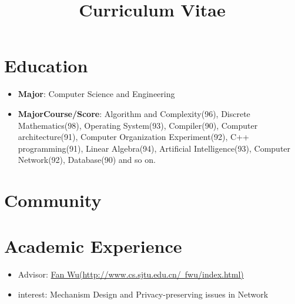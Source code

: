 \documentclass[11pt,a4paper]{moderncv}
\title{Curriculum Vitae}
\begin{document}
\maketitle

\section{Education}
{
\begin{itemize}
\item \textbf{Major}: Computer Science and Engineering
\item \textbf{MajorCourse/Score}: Algorithm and Complexity(96), Discrete Mathematics(98), Operating System(93), Compiler(90), Computer architecture(91), Computer Organization Experiment(92), C++ programming(91), Linear Algebra(94), Artificial Intelligence(93), Computer Network(92), Database(90) and so on.\\
\end{itemize}
}




\section{Community}

\section{Academic Experience}
{
\begin{itemize}
\item Advisor: \href{http://www.cs.sjtu.edu.cn/~fwu/index.html}{Fan Wu(http://www.cs.sjtu.edu.cn/~fwu/index.html)}
\item interest: Mechanism Design and Privacy-preserving issues in Network
\end{itemize}
}
\end{document}

